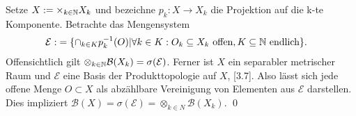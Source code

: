 \begin{proof*}
    Setze $X:= \times_{k \in \mathbb{N}}X_k$ und bezeichne $p_k: X \to X_k$ die Projektion auf die k-te Komponente. Betrachte das Mengensystem
    \begin{align*}
        \mathcal{E} :&= \{ \cap_{k \in K}p_k^{-1}(O) | \forall k \in K: O_k \subseteq X_k \text{ offen}, K \subseteq \mathbb{N} \text{ endlich}\}. 
    \end{align*}
    Offensichtlich gilt $\otimes_{k \in \mathbb{N}}\mathcal{B}(X_k) = \sigma(\mathcal{E})$. 
    Ferner ist $X$ ein separabler metrischer Raum und $\mathcal{E}$ eine Basis der Produkttopologie auf $X$, \cite{querenburg}[3.7]. 
    Also lässt sich jede offene Menge $O \subset X$ als abzählbare Vereinigung von Elementen aus $\mathcal{E}$ darstellen.  
    Dies impliziert $\mathcal{B}(X) = \sigma(\mathcal{E}) = \otimes_{k \in N}\mathcal{B}(X_k)$. \qed
\end{proof*}
